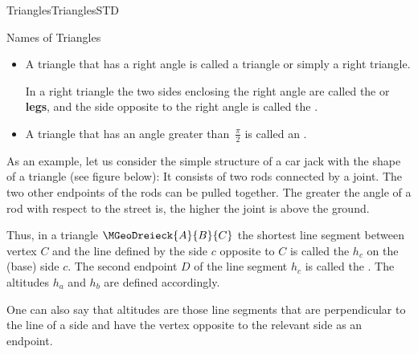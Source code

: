 \begin{MXContent}{Triangles}{Triangles}{STD}
\begin{MXInfo}{Names of Triangles}
\begin{itemize}
 \item A triangle that has a right angle is called a  
  triangle or simply a right triangle.

  In a right triangle the two sides enclosing the right angle are called the 
   or \textbf{legs}, and the side opposite to the right angle
  is called the .    

 \item A triangle that has an angle greater than~$\frac{\pi}{2}$ is called an
  .
\end{itemize}
\end{MXInfo}

As an example, let us consider the simple structure of a car jack with the shape of a triangle (see figure below):
It consists of two rods connected by a joint. The two other endpoints of the rods can be pulled 
together. The greater the angle of a rod with respect to the street is, the higher the joint is 
above the ground.

\begin{center}
\end{center}

Thus, in a triangle $\MGeoDreieck{A}{B}{C}$ the shortest line segment between vertex $C$ and 
the line defined by the side $c$ opposite to $C$ is called the
 $h_c$ on the (base) side $c$.
The second endpoint $D$ of the line segment $h_c$ is called the . The altitudes $h_a$ and 
$h_b$ are defined accordingly.

One can also say that altitudes are those line segments that are perpendicular to the 
line of a side and have the vertex opposite to the relevant side as an endpoint. 
\end{MXContent}


